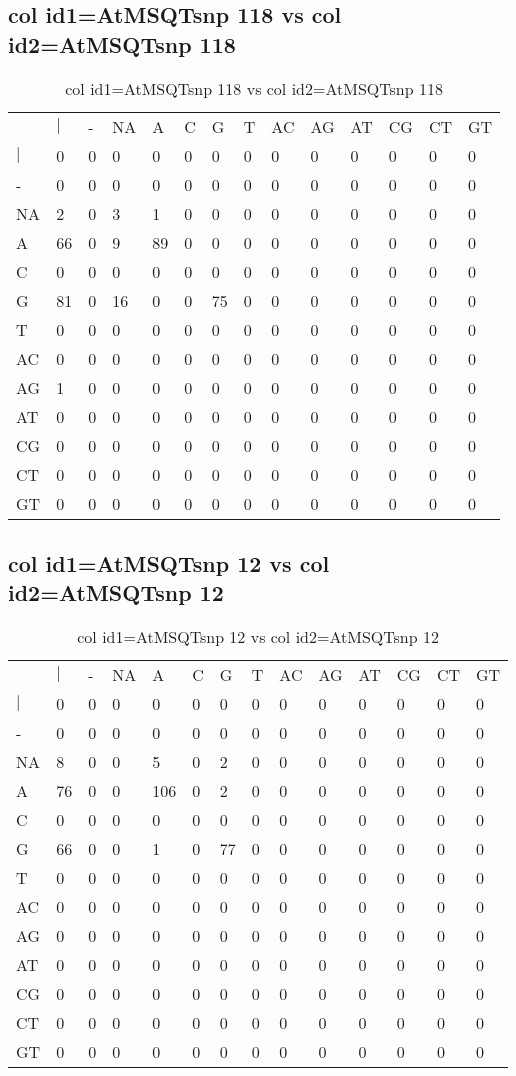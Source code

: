 \subsection{col id1=AtMSQTsnp 118 vs col id2=AtMSQTsnp 118}
\begin{center}
\begin{longtable}{|l|l|l|l|l|l|l|l|l|l|l|l|l|l|}
\caption{col id1=AtMSQTsnp 118 vs col id2=AtMSQTsnp 118} \label{table_dm702}\\
\hline
\\
\hline
&$|$&-&NA&A&C&G&T&AC&AG&AT&CG&CT&GT\\
$|$&0&0&0&0&0&0&0&0&0&0&0&0&0\\
-&0&0&0&0&0&0&0&0&0&0&0&0&0\\
NA&2&0&3&1&0&0&0&0&0&0&0&0&0\\
A&66&0&9&89&0&0&0&0&0&0&0&0&0\\
C&0&0&0&0&0&0&0&0&0&0&0&0&0\\
G&81&0&16&0&0&75&0&0&0&0&0&0&0\\
T&0&0&0&0&0&0&0&0&0&0&0&0&0\\
AC&0&0&0&0&0&0&0&0&0&0&0&0&0\\
AG&1&0&0&0&0&0&0&0&0&0&0&0&0\\
AT&0&0&0&0&0&0&0&0&0&0&0&0&0\\
CG&0&0&0&0&0&0&0&0&0&0&0&0&0\\
CT&0&0&0&0&0&0&0&0&0&0&0&0&0\\
GT&0&0&0&0&0&0&0&0&0&0&0&0&0\\
\hline
\end{longtable}
\end{center}

\subsection{col id1=AtMSQTsnp 12 vs col id2=AtMSQTsnp 12}
\begin{center}
\begin{longtable}{|l|l|l|l|l|l|l|l|l|l|l|l|l|l|}
\caption{col id1=AtMSQTsnp 12 vs col id2=AtMSQTsnp 12} \label{table_dm704}\\
\hline
\\
\hline
&$|$&-&NA&A&C&G&T&AC&AG&AT&CG&CT&GT\\
$|$&0&0&0&0&0&0&0&0&0&0&0&0&0\\
-&0&0&0&0&0&0&0&0&0&0&0&0&0\\
NA&8&0&0&5&0&2&0&0&0&0&0&0&0\\
A&76&0&0&106&0&2&0&0&0&0&0&0&0\\
C&0&0&0&0&0&0&0&0&0&0&0&0&0\\
G&66&0&0&1&0&77&0&0&0&0&0&0&0\\
T&0&0&0&0&0&0&0&0&0&0&0&0&0\\
AC&0&0&0&0&0&0&0&0&0&0&0&0&0\\
AG&0&0&0&0&0&0&0&0&0&0&0&0&0\\
AT&0&0&0&0&0&0&0&0&0&0&0&0&0\\
CG&0&0&0&0&0&0&0&0&0&0&0&0&0\\
CT&0&0&0&0&0&0&0&0&0&0&0&0&0\\
GT&0&0&0&0&0&0&0&0&0&0&0&0&0\\
\hline
\end{longtable}
\end{center}

